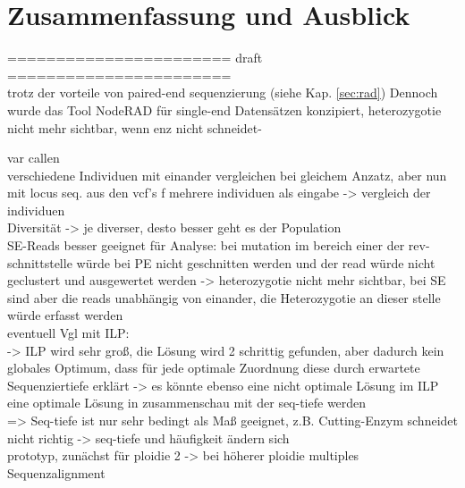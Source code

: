 \chapter{Zusammenfassung und Ausblick} \label{sec:ausblick} 


\noindent======================= draft =======================\\

trotz der vorteile von paired-end sequenzierung (siehe Kap. \ref{sec:rad})
Dennoch wurde das Tool NodeRAD für single-end Datensätzen konzipiert, heterozygotie nicht mehr sichtbar, wenn enz nicht schneidet-



var callen\\
verschiedene Individuen mit einander vergleichen bei gleichem Anzatz, aber nun mit locus seq. aus den vcf's f mehrere individuen als eingabe -> vergleich der individuen \\
Diversität -> je diverser, desto besser geht es der Population\\
SE-Reads besser geeignet für Analyse: bei mutation im bereich einer der rev-schnittstelle  würde bei PE nicht geschnitten werden und der read würde nicht geclustert und ausgewertet werden -> heterozygotie nicht mehr sichtbar, bei SE sind aber die reads unabhängig von einander, die Heterozygotie an dieser stelle würde erfasst werden\\
eventuell Vgl mit ILP:\\
-> ILP wird sehr groß, die Lösung wird 2 schrittig gefunden, aber dadurch kein globales Optimum, dass für jede optimale Zuordnung diese durch erwartete Sequenziertiefe erklärt -> es könnte ebenso eine nicht optimale Lösung im ILP eine optimale Lösung in zusammenschau mit der seq-tiefe werden \\
=> Seq-tiefe ist nur sehr bedingt als Maß geeignet, z.B. Cutting-Enzym schneidet nicht richtig -> seq-tiefe und häufigkeit ändern sich\\

prototyp, zunächst für ploidie 2 -> bei höherer ploidie multiples Sequenzalignment ~\cite{liu_2010} ~\cite{yoon_2009} ~\cite{durbin_1998}


\section{} \label{sec:}
\subsection{} \label{subsec:}